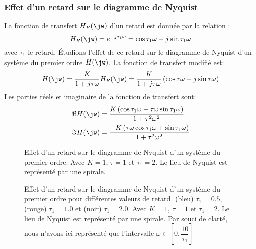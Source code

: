 \subsubsection{Effet d'un retard sur le diagramme de Nyquist}
La fonction de transfert $H_R(\jw)$ d'un retard est donnée par la relation :
$$
H_R(\jw)=e^{-j\tau_1\omega}=\cos{\tau_1\omega}-j\sin{\tau_1\omega}
$$
avec $\tau_1$ le retard. 
\'Etudions l'effet de ce retard sur le diagramme de Nyquist d'un système 
du premier ordre $H(\jw)$. La fonction de transfert modifié est:
$$
H(\jw)=\dfrac{K}{1+j\tau\omega}H_R(\jw)=
\dfrac{K}{1+j\tau\omega}\left(\cos{\tau\omega}-j\sin{\tau\omega}\right)
$$
Les parties réels et imaginaire de la fonction de transfert sont:
\begin{align*}
\Re{H(\jw)}&=
\dfrac{K\left(\cos{\tau_1\omega-\tau\omega\sin{\tau_1\omega}}\right)}
      {1+\tau^2\omega^2}\\
\Im{H(\jw)}&=
\dfrac{-K\left(\tau\omega\cos{\tau_1\omega+\sin{\tau_1\omega}}\right)}
{1+\tau^2\omega^2}\\
\end{align*}
\begin{figure}[!h]
    \centering
    
    \caption{Effet d'un retard sur le diagramme de Nyquist d'un système 
             du premier ordre. Avec $K=1$, $\tau=1$ et $\tau_1=2$. Le lieu 
             de Nyquist est représenté par une spirale.
             \label{fig-nyquist_effet_retard_1}}
\end{figure}
\begin{figure}[!h]
    \centering
    
    \caption{Effet d'un retard sur le diagramme de Nyquist d'un système du 
             premier ordre pour différentes valeurs de retard. (bleu) 
             $\tau_1=0.5$, (rouge) $\tau_1=1.0$ et (noir) $\tau_1=2.0$.
             Avec $K=1$, $\tau=1$ et $\tau_1=2$. Le lieu de Nyquist est 
             représenté par une spirale. Par souci de clarté, nous n'avons 
             ici représenté que l'intervalle $\omega\in[0,\dfrac{10}{\tau_1}]$ 
             \label{fig-nyquist_effet_retard_2}}
\end{figure}
